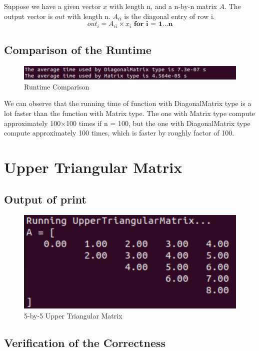 \documentclass[10pt,a4paper]{article}
\begin{document}
Suppose we have a given vector $x$ with length n, and a n-by-n matrix $A$. The output vector is $out$ with length n. $A_{ii}$ is the diagonal entry of row i.
\[
    out_{i} = A_{ii} \times x_{i} \textbf{ for i = 1...n}
\]

\subsection{Comparison of the Runtime}
\begin{figure}[!ht]
        \centering \includegraphics[scale=1]{figures/diagonal runtime.png}
        \caption{Runtime Comparison}
\end{figure}

We can observe that the running time of function with DiagonalMatrix type is a lot faster than the function with Matrix type. The one with Matrix type compute approximately 100$\times$100 times if n = 100, but the one with DiagonalMatrix type compute approximately 100 times, which is faster by roughly factor of 100. 


\section{Upper Triangular Matrix}
\subsection{Output of print}

\begin{figure}[!ht]
        \centering \includegraphics[scale=1]{figures/uppertriangular matrix print.png}
        \caption{5-by-5 Upper Triangular Matrix}
\end{figure}

\subsection{Verification of the Correctness}
\end{document}
